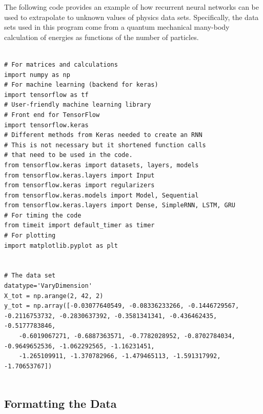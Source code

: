\documentclass[%
oneside,                 %
final,                   %
10pt]{article}
\begin{document}
The following code provides an example of how recurrent neural
networks can be used to extrapolate to unknown values of physics data
sets.  Specifically, the data sets used in this program come from
a quantum mechanical many-body calculation of energies as functions of the number of particles.































\begin{verbatim}

# For matrices and calculations
import numpy as np
# For machine learning (backend for keras)
import tensorflow as tf
# User-friendly machine learning library
# Front end for TensorFlow
import tensorflow.keras
# Different methods from Keras needed to create an RNN
# This is not necessary but it shortened function calls 
# that need to be used in the code.
from tensorflow.keras import datasets, layers, models
from tensorflow.keras.layers import Input
from tensorflow.keras import regularizers
from tensorflow.keras.models import Model, Sequential
from tensorflow.keras.layers import Dense, SimpleRNN, LSTM, GRU
# For timing the code
from timeit import default_timer as timer
# For plotting
import matplotlib.pyplot as plt


# The data set
datatype='VaryDimension'
X_tot = np.arange(2, 42, 2)
y_tot = np.array([-0.03077640549, -0.08336233266, -0.1446729567, -0.2116753732, -0.2830637392, -0.3581341341, -0.436462435, -0.5177783846,
	-0.6019067271, -0.6887363571, -0.7782028952, -0.8702784034, -0.9649652536, -1.062292565, -1.16231451, 
	-1.265109911, -1.370782966, -1.479465113, -1.591317992, -1.70653767])


\end{verbatim}


\subsection*{Formatting the Data}
\end{document}
